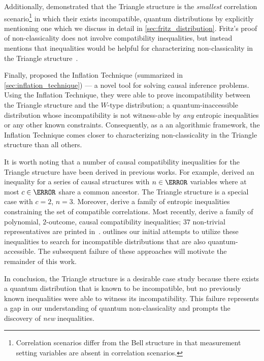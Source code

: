 \documentclass[aps, 10pt, english, twoside, pra, nofootinbib, tightenlines, longbibliography, superscriptaddress]{revtex4-1}
\begin{document}
    Additionally, \citet{Fritz_2012} demonstrated that the Triangle structure is the \textit{smallest} correlation scenario\footnote{Correlation scenarios differ from the Bell structure in that measurement setting variables are absent in correlation scenarios.} in which their exists incompatible, quantum distributions by explicitly mentioning one which we discuss in detail in \cref{sec:fritz_distribution}. Fritz's proof of non-classicality does not involve compatibility inequalities, but instead mentions that inequalities would be helpful for characterizing non-classicality in the Triangle structure~\cite{Fritz_2012}.

    Finally, \citet{Inflation} proposed the Inflation Technique (summarized in \cref{sec:inflation_technique}) --- a novel tool for solving causal inference problems. Using the Inflation Technique, they were able to prove incompatibility between the Triangle structure and the $W$-type distribution; a quantum-inaccessible distribution whose incompatibility is not witness-able by \textit{any} entropic inequalities or any other known constraints. Consequently, as a an algorithmic framework, the Inflation Technique comes closer to characterizing non-classicality in the Triangle structure than all others.

    It is worth noting that a number of causal compatibility inequalities for the Triangle structure have been derived in previous works. For example, \citet{Steudel_2010} derived an inequality for a series of causal structures with $n \in \N$ variables where at most $c \in \N$ share a common ancestor. The Triangle structure is a special case with $c = 2$, $n = 3$. Moreover, \citet{Henson_2014} derive a family of entropic inequalities constraining the set of compatible correlations. Most recently, \citet{Inflation} derive a family of polynomial, $2$-outcome, causal compatibility inequalities; $37$ non-trivial representatives are printed in~\cite{Inflation}.  outlines our initial attempts to utilize these inequalities to search for incompatible distributions that are also quantum-accessible. The subsequent failure of these approaches will motivate the remainder of this work.

    In conclusion, the Triangle structure is a desirable case study because there exists a quantum distribution that is known to be incompatible, but no previously known inequalities were able to witness its incompatibility. This failure represents a gap in our understanding of quantum non-classicality and prompts the discovery of \textit{new} inequalities.
\end{document}

